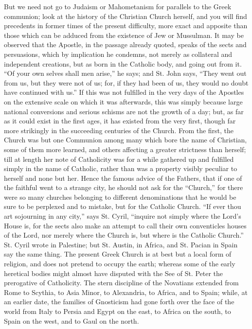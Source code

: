 But we need not go to Judaism or Mahometanism for parallels to the
Greek communion; look at the history of the Christian Church herself,
and you will find precedents in former times of the present
difficulty, more exact and apposite than those which can be adduced
from the existence of Jew or Mussulman. It may be observed that the
Apostle, in the passage already quoted, speaks of the sects and
persuasions, which by implication he condemns, not merely as
collateral and independent creations, but as born in the Catholic
body, and going out from it. ``Of your own selves shall men
arise,'' he says; and St. John says, ``They went out from us,
but they were not of us; for, if they had been of us, they would no
doubt have continued with us.'' If this was not fulfilled in the
very days of the Apostles on the extensive scale on which it was
afterwards, this was simply because large national conversions and
serious schisms are not the growth of a day; but, as far as it could
exist in the first ages, it has existed from the very first, though
far more strikingly in the succeeding centuries of the Church. From
the first, the Church was but one Communion among many which bore the
name of Christian, some of them more learned, and others affecting a
greater strictness than herself; till at length her note of
Catholicity was for a while gathered up and fulfilled simply in the
name of Catholic, rather than was a property visibly peculiar to
herself and none but her. Hence the famous advice of the Fathers, that
if one of the faithful went to a strange city, he should not ask for
the ``Church,'' for there were so many churches belonging to
different denominations that he would be sure to be perplexed and to
mistake, but for the Catholic Church. ``If ever thou art
sojourning in any city,'' says St. Cyril, ``inquire not simply
where the Lord's House is, for the sects also make an attempt to call
their own conventicles houses of the Lord, nor merely where the Church
is, but where is the Catholic Church.'' St. Cyril wrote in Palestine; but St. Austin, in
Africa, and St. Pacian in Spain say the same thing. The present Greek
Church is at best but a local form of religion, and does not pretend
to occupy the earth; whereas some of the early heretical bodies might
almost have disputed with the See of St. Peter the prerogative of
Catholicity. The stern discipline of the Novatians extended from Rome
to Scythia, to Asia Minor, to Alexandria, to Africa, and to Spain;
while, at an earlier date, the families of Gnosticism had gone forth
over the face of the world from Italy to Persia and Egypt on the east,
to Africa on the south, to Spain on the west, and to Gaul on the
north.

